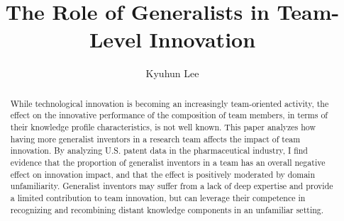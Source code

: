 \documentclass{article}
\title{The Role of Generalists in Team-Level Innovation}
\author{Kyuhun Lee}
\date{}
\begin{document}
\maketitle

\begin{abstract}
    While technological innovation is becoming an increasingly team-oriented activity, the effect on the innovative performance of the composition of team members, in terms of their knowledge profile characteristics, is not well known. This paper analyzes how having more generalist inventors in a research team affects the impact of team innovation. By analyzing U.S. patent data in the pharmaceutical industry, I find evidence that the proportion of generalist inventors in a team has an overall negative effect on innovation impact, and that the effect is positively moderated by domain unfamiliarity. Generalist inventors may suffer from a lack of deep expertise and provide a limited contribution to team innovation, but can leverage their competence in recognizing and recombining distant knowledge components in an unfamiliar setting. 
\end{abstract}

\newpage
\thispagestyle{empty}
\tableofcontents
\end{document}
